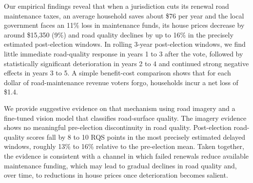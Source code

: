 Our empirical findings reveal that when a jurisdiction cuts its renewal road maintenance taxes, an average household saves about \$76 per year and the local government  faces an 11\% loss in maintenance funds, its house prices decrease by around \$15,350 (9\%) and road quality declines by up to 16\% in the precisely estimated post-election windows. In rolling 3-year post-election windows, we find little immediate road-quality response in years 1 to 3 after the vote, followed by statistically significant deterioration in years 2 to 4 and continued strong negative effects in years 3 to 5. A simple benefit-cost comparison shows that for each dollar of road-maintenance revenue voters forgo, households incur a net loss of \$1.4.


  
We provide suggestive evidence on that mechanism using road imagery and a fine-tuned vision model that classifies road-surface quality. The imagery evidence shows no meaningful pre-election discontinuity in road quality. Post-election road-quality scores fall by 8 to 10 RQS points in the most precisely estimated delayed windows, roughly 13\% to 16\% relative to the pre-election mean. Taken together, the evidence is consistent with a channel in which failed renewals reduce available maintenance funding, which may lead to gradual declines in road quality and, over time, to reductions in house prices once deterioration becomes salient. 

